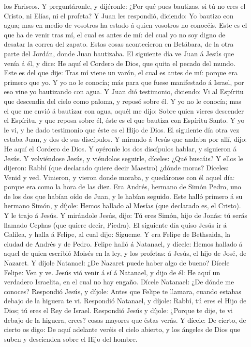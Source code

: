los Fariseos.  Y preguntáronle, y dijéronle: ¿Por qué
pues bautizas, si tú no eres el Cristo, ni Elías, ni el profeta?
 Y Juan les respondió, diciendo: Yo bautizo con agua; mas
en medio de vosotros ha estado á quien vosotros no conocéis.
 Este es el que ha de venir tras mí, el cual es antes de
mí: del cual yo no soy digno de desatar la correa del zapato.
 Estas cosas acontecieron en Betábara, de la otra parte
del Jordán, donde Juan bautizaba.  El siguiente día ve
Juan á Jesús que venía á él, y dice: He aquí el Cordero de Dios, que
quita el pecado del mundo.  Este es del que dije: Tras mí
viene un varón, el cual es antes de mí: porque era primero que yo.
 Y yo no le conocía; más para que fuese manifestado á
Israel, por eso vine yo bautizando con agua.  Y Juan dió
testimonio, diciendo: Vi al Espíritu que descendía del cielo como
paloma, y reposó sobre él.  Y yo no le conocía; mas el
que me envió á bautizar con agua, aquél me dijo: Sobre quien vieres
descender el Espíritu, y que reposa sobre él, éste es el que bautiza con
Espíritu Santo.  Y yo le vi, y he dado testimonio que
éste es el Hijo de Dios.  El siguiente día otra vez
estaba Juan, y dos de sus discípulos.  Y mirando á Jesús
que andaba por allí, dijo: He aquí el Cordero de Dios.  Y
oyéronle los dos discípulos hablar, y siguieron á Jesús. 
Y volviéndose Jesús, y viéndolos seguirle, díceles: ¿Qué buscáis? Y
ellos le dijeron: Rabbí (que declarado quiere decir Maestro) ¿dónde
moras?  Díceles: Venid y ved. Vinieron, y vieron donde
moraba, y quedáronse con él aquel día: porque era como la hora de las
diez.  Era Andrés, hermano de Simón Pedro, uno de los dos
que habían oído de Juan, y le habían seguido.  Este halló
primero á su hermano Simón, y díjole: Hemos hallado al Mesías (que
declarado es, el Cristo).  Y le trajo á Jesús. Y
mirándole Jesús, dijo: Tú eres Simón, hijo de Jonás: tú serás llamado
Cephas (que quiere decir, Piedra).  El siguiente día
quiso Jesús ir á Galilea, y halla á Felipe, al cual dijo: Sígueme.
 Y era Felipe de Bethsaida, la ciudad de Andrés y de
Pedro.  Felipe halló á Natanael, y dícele: Hemos hallado
á aquel de quien escribió Moisés en la ley, y los profetas: á Jesús, el
hijo de José, de Nazaret.  Y díjole Natanael: ¿De Nazaret
puede haber algo de bueno? Dícele Felipe: Ven y ve. 
Jesús vió venir á sí á Natanael, y dijo de él: He aquí un verdadero
Israelita, en el cual no hay engaño.  Dícele Natanael:
¿De dónde me conoces? Respondió Jesús, y díjole: Antes que Felipe te
llamara, cuando estabas debajo de la higuera te vi. 
Respondió Natanael, y díjole: Rabbí, tú eres el Hijo de Dios; tú eres el
Rey de Israel.  Respondió Jesús y díjole: ¿Porque te
dije, te vi debajo de la higuera, crees? cosas mayores que éstas verás.
 Y dícele: De cierto, de cierto os digo: De aquí adelante
veréis el cielo abierto, y los ángeles de Dios que suben y descienden
sobre el Hijo del hombre.

